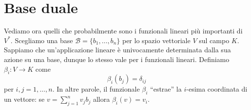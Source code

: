 \section{Base duale}
\label{sec:base-duale}
Vediamo ora quelli che probabilmente sono i funzionali lineari più importanti di $V^*$.
Scegliamo una base $\mathcal B=\{b_1,\dots,b_n\}$ per lo spazio vettoriale $V$ sul campo $K$.
Sappiamo che un'applicazione lineare è univocamente determinata dalla sua azione su una base, dunque lo stesso vale per i funzionali lineari.
Definiamo $\beta_i\colon V\to K$ come
\begin{equation}
	\beta_i(b_j)=\delta_{ij}
	\label{eq:funzionale-coordinate}
\end{equation}
per $i,j=1,\dots,n$.
In altre parole, il funzionale $\beta_i$ ``estrae'' la $i$-esima coordinata di un vettore: se $v=\sum_{j=1}^nv_jb_j$ allora $\beta_i(v)=v_i$.

